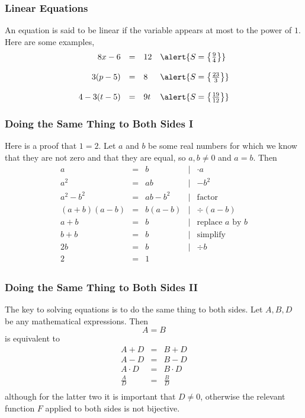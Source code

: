 \documentclass[xcolor=dvipsnames]{beamer}
\begin{document}
\begin{frame}
  \frametitle{Linear Equations}
An equation is said to be linear if the variable appears at most to the
power of $1$. Here are some examples,
\begin{equation}
  \label{eq:auxaiboz}
  \begin{array}{rcll}
8x-6&=&12&\alert{S=\left\{\frac{9}{4}\right\}} \\
\hspace{.5in} &&& \\
3(p-5)&=&8&\alert{S=\left\{\frac{23}{3}\right\}} \\
\hspace{.5in} &&& \\
4-3(t-5)&=&9t&\alert{S=\left\{\frac{19}{12}\right\}}
  \end{array}
\end{equation}
\end{frame}

\begin{frame}
  \frametitle{Doing the Same Thing to Both Sides I}
Here is a proof that $1=2$. Let $a$ and $b$ be some real numbers for
which we know that they are not zero and that they are equal, so
$a,b\neq{}0$ and $a=b$. Then
\begin{equation}
  \label{eq:fdlsjfjj}
  \begin{array}{rclcl}
    a&=&b&|&\cdot{}a \\
    a^{2}&=&ab&|&-b^{2} \\
    a^{2}-b^{2}&=&ab-b^{2}&|&\mbox{factor} \\
    (a+b)(a-b)&=&b(a-b)&|&\div{}(a-b) \\
    a+b&=&b&|&\mbox{replace }a\mbox{ by }b \\
    b+b&=&b&|&\mbox{simplify} \\
    2b&=&b&|&\div{}b \\
    2&=&1&& \\
  \end{array}
\end{equation}
\end{frame}

\begin{frame}
  \frametitle{Doing the Same Thing to Both Sides II}
  The key to solving equations is to \alert{do the same thing to both
    sides}. Let $A,B,D$ be any mathematical expressions. Then
\begin{equation}
  \label{eq:iughaijo}
  A=B
\end{equation}
is equivalent to
\begin{equation}
  \label{eq:ieraechi}
  \begin{array}{rcl}
    A+D&=&B+D \\
    A-D&=&B-D \\
    A\cdot{}D&=&B\cdot{}D \\
    \frac{A}{D}&=&\frac{B}{D} \\
  \end{array}
\end{equation}
although for the latter two it is important that $D\neq{}0$,
otherwise the relevant function $F$ applied to both sides is not
bijective.
\end{frame}
\end{document}
